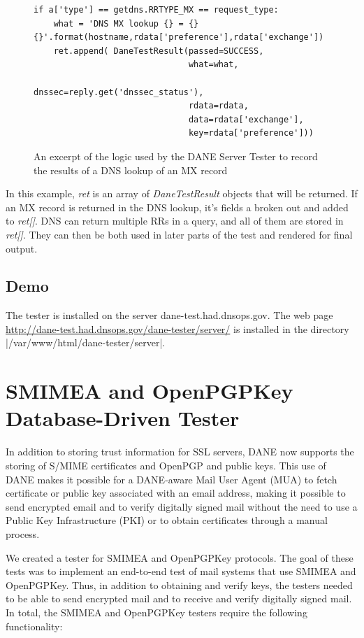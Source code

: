 \documentclass[preprint,3p]{elsarticle}
\begin{document}
\begin{figure}
\begin{lstlisting}
if a['type'] == getdns.RRTYPE_MX == request_type:
    what = 'DNS MX lookup {} = {} {}'.format(hostname,rdata['preference'],rdata['exchange'])
    ret.append( DaneTestResult(passed=SUCCESS,
                               what=what,
                               dnssec=reply.get('dnssec_status'),
                               rdata=rdata,
                               data=rdata['exchange'],
                               key=rdata['preference']))
\end{lstlisting}
\caption{An excerpt of the logic used by the DANE Server Tester to
  record the results of a DNS lookup of an MX record }\label{snippet}
\end{figure}

In this example, \emph{ret} is an array of \emph{DaneTestResult}
objects that will be returned. If an MX record is returned in the DNS
lookup, it's fields a broken out and added to \emph{ret[]}. DNS can
return multiple RRs in a query, and all of them are stored in
\emph{ret[]}.  They can then be both used in later parts of the test
and rendered for final output.

\subsection{Demo}
The tester is installed on the server dane-test.had.dnsops.gov. The
web page \url{http://dane-test.had.dnsops.gov/dane-tester/server/} is installed in the
directory |/var/www/html/dane-tester/server|.

\section{SMIMEA and OpenPGPKey Database-Driven Tester}
In addition to storing trust information for SSL servers, DANE now
supports the storing of S/MIME certificates and OpenPGP and public keys. This use
of DANE makes it possible for a DANE-aware Mail User Agent (MUA) to
fetch certificate or public key associated with an email address,
making it possible to send encrypted email and to verify digitally
signed mail without the need to use a Public Key Infrastructure (PKI)
or to obtain certificates through a manual process.

We created a tester for SMIMEA and OpenPGPKey protocols. The goal of
these tests was to implement an end-to-end test of mail systems that
use SMIMEA and OpenPGPKey. Thus, in addition to obtaining and verify
keys, the testers needed to be able to send encrypted mail and to
receive and verify digitally signed mail. In total, the 
SMIMEA and OpenPGPKey testers require the following functionality:
\end{document}
